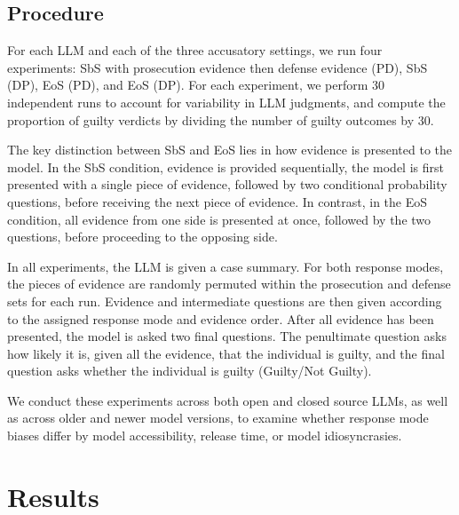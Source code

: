 \documentclass[11pt, letterpaper]{article}
\begin{document}
\subsection{Procedure}
For each LLM and each of the three accusatory settings, we run four experiments: SbS with prosecution evidence then defense evidence (PD), SbS (DP), EoS (PD), and EoS (DP). For each experiment, we perform 30 independent runs to account for variability in LLM judgments, and compute the proportion of guilty verdicts by dividing the number of guilty outcomes by 30.

The key distinction between SbS and EoS lies in how evidence is presented to the model. In the SbS condition, evidence is provided sequentially, the model is first presented with a single piece of evidence, followed by two conditional probability questions, before receiving the next piece of evidence. In contrast, in the EoS condition, all evidence from one side is presented at once, followed by the two questions, before proceeding to the opposing side.

In all experiments, the LLM is given a case summary. For both response modes, the pieces of evidence are randomly permuted within the prosecution and defense sets for each run. Evidence and intermediate questions are then given according to the assigned response mode and evidence order. After all evidence has been presented, the model is asked two final questions. The penultimate question asks how likely it is, given all the evidence, that the individual is guilty, and the final question asks whether the individual is guilty (Guilty/Not Guilty).

We conduct these experiments across both open and closed source LLMs, as well as across older and newer model versions, to examine whether response mode biases differ by model accessibility, release time, or model idiosyncrasies. 

\section{Results}
\end{document}
